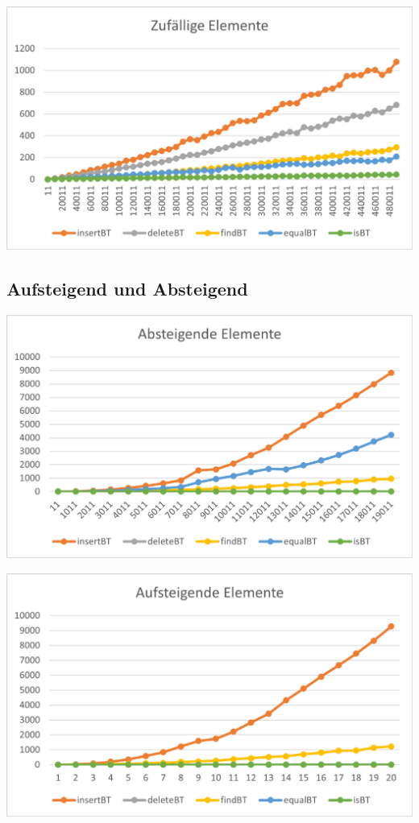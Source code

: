 \documentclass[11pt]{article}
\begin{document}
    \begin{center}
        \includegraphics[width=0.9\columnwidth] {ZeitAvg.pdf}
    \end{center}

    \subsection{Aufsteigend und Absteigend}\label{subsec:average}
    \begin{center}
        \includegraphics[width=0.9\columnwidth] {ZeitAb.pdf}

    \end{center}\begin{center}
                    \includegraphics[width=0.9\columnwidth] {ZeitAuf.pdf}
    \end{center}
\end{document}
